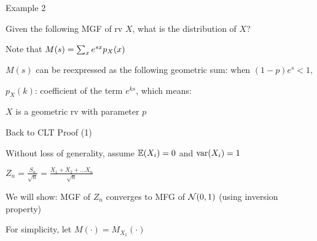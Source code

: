 \begin{frame}{Example 2}


\plitemsep 0.1in
\bci
\item Given the following MGF of rv $X$, what is the distribution of $X$?
\item<2-> Note that $M(s) = \sum_x e^{sx} p_X(x)$

\item<3-> $M(s)$ can be reexpressed as the following geometric sum: when $(1-p)e^s <1,$

\item<4-> $p_X(k)$: coefficient of the term $e^{ks}$, which means:

\item<5-> $X$ is a geometric rv with parameter $p$
\eci
\end{frame}


\begin{frame}{Back to CLT Proof (1)}

\plitemsep 0.1in
\bci
\item<1->  Without loss of generality, assume $\mathbb{E}( X_i )=0$ and $\text{var}( X_i ) = 1$

\item<2->  $\displaystyle Z_n = \frac{S_n}{\sqrt{n}} = \frac{X_1 + X_2 + \ldots X_n}{\sqrt{n}}$

\item<3->  We will show: MGF of $Z_n$ converges to MFG of $\mathcal N(0,1)$ (using inversion property)

\item<4-> \proff

\item<7-> For simplicity, let $M(\cdot) = M_{X_1}(\cdot)$
\eci

\end{frame}

